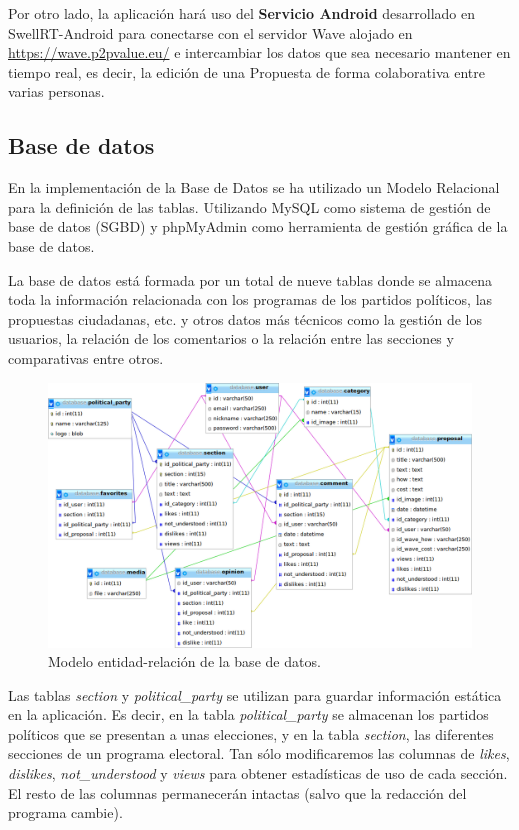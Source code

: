 Por otro lado, la aplicación hará uso del \textbf{Servicio Android} desarrollado en SwellRT-Android \cite{ref:swellRT_android_github} para conectarse con el servidor Wave alojado en \url{https://wave.p2pvalue.eu/} e intercambiar los datos que sea necesario mantener en tiempo real, es decir, la edición de una Propuesta de forma colaborativa entre varias personas.


\subsection{Base de datos}

En la implementación de la Base de Datos se ha utilizado un Modelo Relacional para la definición de las tablas. Utilizando MySQL \cite{ref:mysql} como sistema de gestión de base de datos (SGBD) y phpMyAdmin \cite{ref:phpMyAdmin} como herramienta de gestión gráfica de la base de datos.

La base de datos está formada por un total de nueve tablas donde se almacena toda la información relacionada con los programas de los partidos políticos, las propuestas ciudadanas, etc. y otros datos más técnicos como la gestión de los usuarios, la relación de los comentarios o la relación entre las secciones y comparativas entre otros.

\begin{figure}[!]
\centering
\includegraphics[keepaspectratio, scale=0.40]{Media/Captures/database.png}
\caption{Modelo entidad-relación de la base de datos.}
\label{fig:ermodel}
\end{figure}

Las tablas \textit{section} y \textit{political\_party} se utilizan para guardar información estática en la aplicación. Es decir, en la tabla \textit{political\_party} se almacenan los partidos políticos que se presentan a unas elecciones, y en la tabla \textit{section}, las diferentes secciones de un programa electoral. Tan sólo modificaremos las columnas de \textit{likes}, \textit{dislikes}, \textit{not\_understood} y \textit{views} para obtener estadísticas de uso de cada sección. El resto de las columnas permanecerán intactas (salvo que la redacción del programa cambie).

